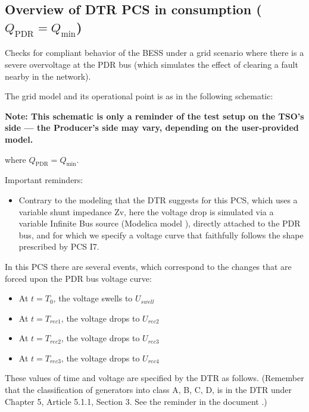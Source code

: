     \subsection{Overview of DTR PCS \DTRPcs{} in consumption ($Q_\text{PDR} = Q_\text{min}$)}

    Checks for compliant behavior of the BESS under a grid scenario where
    there is a severe overvoltage at the PDR bus (which simulates the
    effect of clearing a fault nearby in the network).

    The grid model and its operational point is as in the following schematic:
    \begin{center}
        
    \end{center}
    \begin{center}
        \small \textbf{Note: This schematic is only a reminder of the test setup on the TSO's
        side --- the Producer's side may vary, depending on the user-provided model.}
    \end{center}
    where $Q_\text{PDR} = Q_\text{min}$.

    \noindent Important reminders:
    \begin{itemize}
        \item Contrary to the modeling that the DTR suggests for this PCS, which uses a
        variable shunt impedance Zv, here the voltage drop is simulated via a variable
        Infinite Bus source (Modelica model ), directly
        attached to the PDR bus, and for which we specify a voltage curve that
        faithfully follows the shape prescribed by PCS I7.
    \end{itemize}

    In this PCS there are several events, which correspond to the changes that are
    forced upon the PDR bus voltage curve:
    \begin{itemize}
        \item At $t = T_{0}$, the voltage swells to $U_{swell}$
        \item At $t = T_{rec1}$, the voltage drops to $U_{rec2}$
        \item At $t = T_{rec2}$, the voltage drops to $U_{rec3}$
        \item At $t = T_{rec3}$, the voltage drops to $U_{rec4}$
    \end{itemize}
    These values of time and voltage are specified by the DTR as follows. (Remember
    that the classification of generators into class A, B, C, D, is in the DTR under
    Chapter 5, Article 5.1.1, Section 3. See the reminder in the document
    .)

